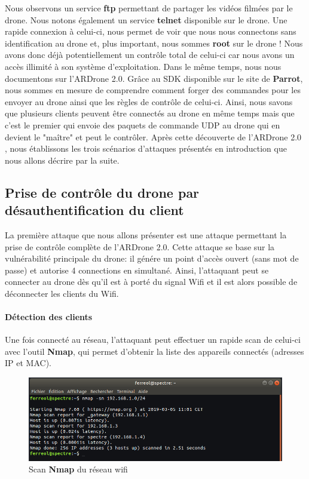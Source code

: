 Nous observons un service \textbf{ftp} permettant de partager les vidéos filmées par le drone. Nous notons également un service \textbf{telnet} disponible sur le drone. Une rapide connexion à celui-ci, nous permet de voir que nous nous connectons sans identification au drone et, plus important, nous sommes \textbf{root} sur le drone ! Nous avons donc déjà potentiellement un contrôle total de celui-ci car nous avons un accès illimité à son système d'exploitation.
\newline
Dans le même temps, nous nous documentons sur l'ARDrone 2.0. Grâce au SDK disponible sur le site de \textbf{Parrot}, nous sommes en mesure de comprendre comment forger des commandes pour les envoyer au drone ainsi que les règles de contrôle de celui-ci. Ainsi, nous savons que plusieurs clients peuvent être connectés au drone en même temps mais que c'est le premier qui envoie des paquets de commande UDP au drone qui en devient le "maître" et peut le contrôler.
\newline Après cette découverte de l'ARDrone 2.0 , nous établissons les trois scénarios d'attaques présentés en introduction que nous allons décrire par la suite.

\subsection{Prise de contrôle du drone par désauthentification du client}
La première attaque que nous allons présenter est une attaque permettant la prise de contrôle complète de l'ARDrone 2.0. Cette attaque se base sur la vulnérabilité principale du drone: il génére un point d'accès ouvert (sans mot de passe) et autorise 4 connections en simultané. Ainsi, l'attaquant peut se connecter au drone dès qu'il est à porté du signal Wifi et il est alors possible de déconnecter les clients du Wifi.
\paragraph{Détection des clients}
Une fois connecté au réseau, l'attaquant peut effectuer un rapide scan de celui-ci avec l'outil \textbf{Nmap}, qui permet d'obtenir la liste des appareils connectés (adresses IP et MAC).

\begin{figure}[H]
  \centering
  \includegraphics[scale=0.5]{images/nmap_res}
  \caption{Scan \textbf{Nmap} du réseau wifi}
\end{figure}

